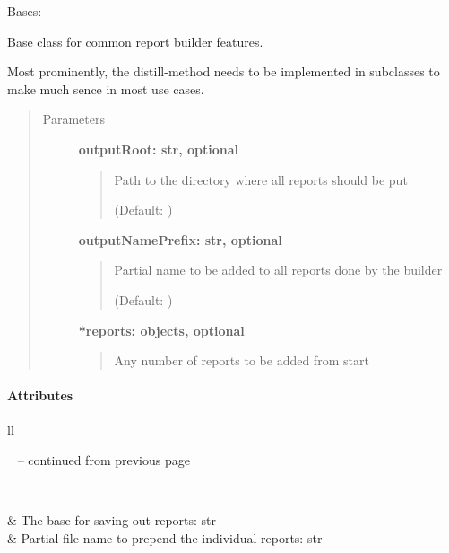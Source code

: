 \documentclass[letterpaper,10pt,english]{sphinxmanual}
\begin{document}
\begin{fulllineitems}
\label{fseq.reporting:fseq.reporting.report_builder.ReportBuilderBase}
Bases: 

Base class for common report builder features.

Most prominently, the distill-method needs to be implemented in
subclasses to make much sence in most use cases.
\begin{quote}\begin{description}
\item[{Parameters}] \leavevmode
\textbf{outputRoot: str, optional}
\begin{quote}

Path to the directory where all reports should be put

(Default: )
\end{quote}

\textbf{outputNamePrefix: str, optional}
\begin{quote}

Partial name to be added to all reports done by the builder

(Default: )
\end{quote}

\textbf{*reports: objects, optional}
\begin{quote}

Any number of reports to be added from start
\end{quote}

\end{description}\end{quote}
\paragraph{Attributes}

\begin{longtable}{ll}
\hline
\endfirsthead

%
{{\textsf{\tablename\ \thetable{} -- continued from previous page}}} \\
\hline
\endhead

\hline {} \\ \hline
\endfoot

\endlastfoot


{\hyperref[fseq.reporting:fseq.reporting.report_builder.ReportBuilderBase.outputRoot]{}}
 & 
The base for saving out reports: str
\\
\hline
{\hyperref[fseq.reporting:fseq.reporting.report_builder.ReportBuilderBase.outputNamePrefix]{}}
 & 
Partial file name to prepend the individual reports: str
\\
\hline\end{longtable}



\end{fulllineitems}
\end{document}
